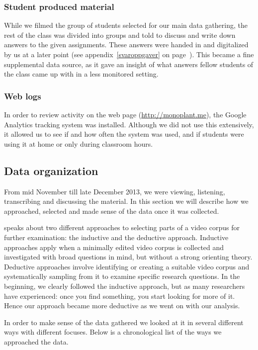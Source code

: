 \subsubsection{Student produced material}
While we filmed the group of students selected for our main data gathering, the rest of the class was divided into groups and told to discuss and write down answers to the given assignments. These answers were handed in and digitalized by us at a later point (see appendix~\ref{svaroppgaver} on page~\pageref{svaroppgaver}). This became a fine supplemental data source, as it gave an insight of what answers fellow students of the class came up with in a less monitored setting. 

\subsubsection{Web logs}
In order to review activity on the web page (\url{http://monoplant.me}), the Google Analytics tracking system was installed. Although we did not use this extensively, it allowed us to see if and how often the system was used, and if students were using it at home or only during classroom hours. 

\subsection{Data organization}
From mid November till late December 2013, we were viewing, listening, transcribing and discussing the material. In this section we will describe how we approached, selected and made sense of the data once it was collected.

\citet{derry2010conducting} speaks about two different approaches to selecting parts of a video corpus for further examination: the inductive and the deductive approach. Inductive approaches apply when a minimally edited video corpus is collected and investigated with broad questions in mind, but without a strong orienting theory. Deductive approaches involve identifying or creating a suitable video corpus and systematically sampling from it to examine specific research questions. \citep{derry2010conducting} In the beginning, we clearly followed the inductive approach, but as many researchers have experienced: once you find something, you start looking for more of it. Hence our approach became more deductive as we went on with our analysis.

In order to make sense of the data gathered we looked at it in several different ways with different focuses. Below is a chronological list of the ways we approached the data. 

